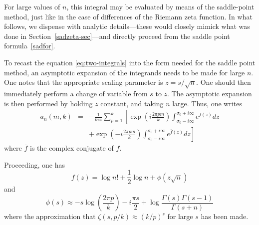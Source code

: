 \documentclass{amsart}
\begin{document}
For large values of $n$, this integral may be evaluated by means
of the saddle-point method, just like in the case of
differences of the Riemann zeta function.
% 
In what follows, we dispense with analytic details---these would
closely mimick what was done in Section~\ref{sadzeta-sec}---and directly proceed  
from the saddle point formula~\eqref{sadfor}.


To recast the equation \eqref{eq:two-integrals} into the form needed
for the saddle point method, an asymptotic expansion of the
integrands needs to be made for large $n$. 
One notes that 
the appropriate scaling parameter is $z=s/\sqrt{n}$. One should then
immediately perform a change of variable from $s$ to $z$. The asymptotic
expansion is then performed by holding $z$ constant, and taking $n$
large. Thus, one writes \begin{eqnarray}
a_{n}(m,k) & = & -\frac{1}{k\pi i}\sum_{p=1}^{k}\left[\exp\left(i\frac{2\pi pm}{k}\right)\int_{\sigma_{0}-i\infty}^{\sigma_{0}+i\infty}e^{f(z)}dz\right.\label{eq:saddle}\\
 &  & \left.+\exp\left(-i\frac{2\pi pm}{k}\right)\int_{\sigma_{0}-i\infty}^{\sigma_{0}+i\infty}e^{\overline{f}(z)}dz\right]\end{eqnarray}
 where $\overline{f}$ is the complex conjugate of $f$. 

Proceeding, one has \begin{equation}
f(z)=\log n!+\frac{1}{2}\log n+\phi\left(z\sqrt{n}\right)\label{eq:}\end{equation}
 and \begin{equation}
\phi(s)\approx-s\log\left(\frac{2\pi p}{k}\right)-i\frac{\pi s}{2}+\log\frac{\Gamma(s)\Gamma(s-1)}{\Gamma(s+n)}\label{eq:}\end{equation}
 where the approximation that $\zeta\left(s,p/k\right)\approx(k/p)^{s}$
for large $s$ has been made. 
\end{document}
